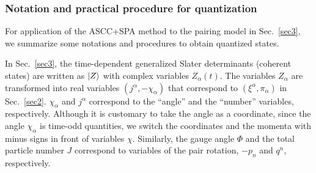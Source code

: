 \documentclass[%
superscriptaddress,
showpacs,
nofootinbib,
amsmath,amssymb,
aps,
prc,
twocolumn,
floatfix ]%
{revtex4-1}
\begin{document}
\subsubsection{Notation and practical procedure for quantization}
\label{sec:notation}

For application of the ASCC+SPA method to the pairing model in Sec.~\ref{sec3},
we summarize some notations and procedures to obtain quantized states.

In Sec.~\ref{sec3}, the time-dependent generalized Slater determinants
(coherent states) are written as $\ket{Z}$ with complex variables
$Z_\alpha(t)$.
The variables $Z_\alpha$ are transformed into real variables
$(j^\alpha, -\chi_\alpha)$ that correspond to $(\xi^\alpha,\pi_\alpha)$
in Sec.~\ref{sec2}.
$\chi_\alpha$ and $j^\alpha$ correspond to
the ``angle'' and the ``number'' variables, respectively.
Although it is customary to take the angle as a coordinate,
since the angle $\chi_\alpha$ is time-odd quantities, 
we switch the coordinates and the momenta with minus signs
in front of variables $\chi$.
Similarly, the gauge angle $\Phi$ and the total particle number $J$
correspond to variables of the pair rotation, $-p_n$ and $q^n$, respectively.


\end{document}

